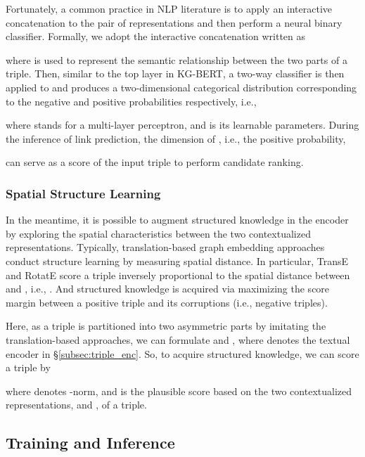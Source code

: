 \documentclass[sigconf]{acmart}
\begin{document}
Fortunately, a common practice in NLP literature is to apply an interactive concatenation \cite{bowman2015snlidataset,liu2016learning,reimers2019sentbert} to the pair of representations and then perform a neural binary classifier. 
Formally, we adopt the interactive concatenation written as

where  is used to represent the semantic relationship between the two parts of a triple. 
Then, similar to the top layer in KG-BERT, a two-way classifier is then applied to  and produces a two-dimensional categorical distribution corresponding to the negative and positive probabilities respectively, i.e.,

 
where  stands for a multi-layer perceptron, and  is its learnable parameters. 
During the inference of link prediction, the  dimension of , i.e., the positive probability, 

can serve as a score of the input triple to perform candidate ranking. 



\subsubsection{Spatial Structure Learning} \label{sec:struc_learn}

In the meantime, it is possible to augment structured knowledge in the encoder by exploring the spatial characteristics between the two contextualized representations. 
Typically, translation-based graph embedding approaches conduct structure learning by measuring spatial distance. 
In particular, TransE \cite{TransE} and RotatE \cite{sun2019rotate} score a triple inversely proportional to the spatial distance between  and , i.e., . 
And structured knowledge is acquired via maximizing the score margin between a positive triple and its corruptions (i.e., negative triples). 

Here, as a triple is partitioned into two asymmetric parts by imitating the translation-based approaches, we can formulate  and , where  denotes the textual encoder in \S\ref{subsec:triple_enc}. 
So, to acquire structured knowledge, we can score a triple by 

where  denotes -norm, and  is the plausible score based on the two contextualized representations,  and  , of a triple.


\subsection{Training and Inference} \label{subsec:objectives}
\end{document}
